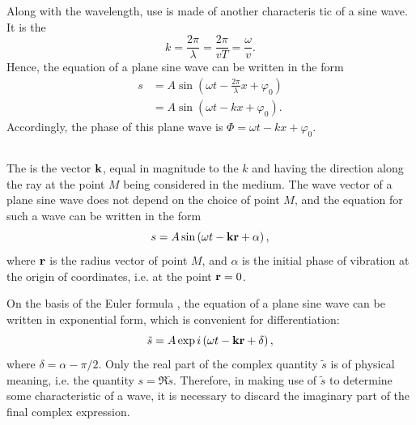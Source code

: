 Along with the wavelength, use is made of another characteris­ tic of a sine wave. It is the 
\begin{equation*}%
k =  \frac{2 \pi}{\lambda} = \frac{2 \pi}{vT} = \frac{\omega}{v}. 
\end{equation*}
Hence, the equation of a plane sine wave  can be written in the form
\begin{align*}%
s & = A \sin \left(  \omega t - \frac{2 \pi}{\lambda} x  + \varphi_{0} \right) \\
& = A \sin \left(  \omega t - k x  + \varphi_{0} \right).
\end{align*}
Accordingly, the phase of this plane wave is $\Phi = \omega t - kx + \varphi_{0}$. 

\subsection{}\label{30.2.7} The  is the vector $\vb{k}$, equal in magnitude to the  $k$ and having the direction along the ray  at the point $M$ being considered in the medium. The wave vector of a plane sine wave does not depend on the choice of point $M$, and the equation for such a wave can be written in the form
\begin{equation*}%
s =  A \sin \left(  \omega t - \vb{k}\vb{r}  + \alpha \right),
\end{equation*}
where $\vb{r}$ is the radius vector of point $M$, and $\alpha$ is the initial phase of vibration at the origin of coordinates, i.e. at the point $\vb{r} = 0$.

On the basis of the Euler formula , the equation of a plane sine wave can be written in exponential form, which is convenient for differentiation:
\begin{equation*}%
\tilde{s} =  A \exp  i \left(  \omega t - \vb{k}\vb{r}  + \delta \right),
\end{equation*}
where $\delta = \alpha - \pi/2$. Only the real part of the complex quantity $\tilde{s}$ is of physical meaning, i.e. the quantity $s = \Re{\tilde{s}}$. Therefore, in making use of $\tilde{s}$ to determine some characteristic of a wave, it is necessary to discard the imaginary part of the final complex expression.

